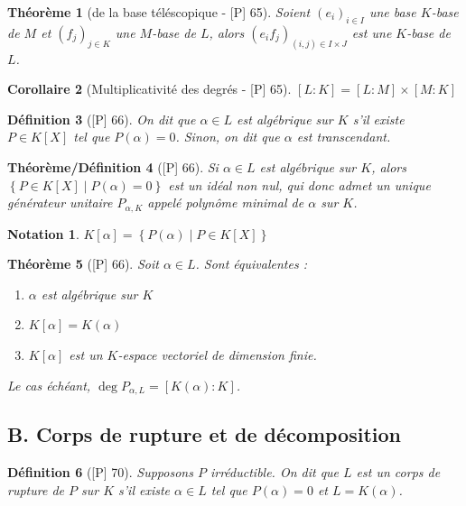 \documentclass[10pt, a4paper, parskip=full, twoside, twocolumn]{report}
\newtheorem{definition}{Définition}
\newtheorem{theorem}[definition]{Théorème}
\newtheorem{theorem_def}[definition]{Théorème/Définition}
\newtheorem{corollary}[definition]{Corollaire}
\newtheorem*{notation*}{Notation}
\begin{document}
\begin{theorem}[de la base téléscopique - \textnormal{[P] 65}]
	Soient $\left(e_i\right)_{i\in I}$ une base $K$-base de $M$ et $\left(f_j\right)_{j\in K}$ une $M$-base de $L$,
	alors $\left(e_if_j\right)_{(i,j)\in I\times J}$ est une $K$-base de $L$.
\end{theorem}

\begin{corollary}[Multiplicativité des degrés - \textnormal{[P] 65}]
	$[L:K] = [L:M]\times [M:K]$
\end{corollary}

\begin{definition}[\textnormal{[P] 66}]
	On dit que $\alpha\in L$ est \emph{algébrique sur $K$} s'il existe $P\in K[X]$ tel que $P(\alpha)=0$.
	Sinon, on dit que $\alpha$ est \emph{transcendant}.
\end{definition}

\begin{theorem_def}[\textnormal{[P] 66}]
	Si $\alpha\in L$ est algébrique sur $K$, alors $\left\{P\in K[X]\mid P(\alpha) = 0\right\}$
	est un idéal non nul, qui donc admet un unique générateur unitaire $P_{\alpha, K}$ appelé \emph{polynôme minimal de $\alpha$ sur $K$}.
\end{theorem_def}

\begin{notation*}
	$K[\alpha] = \left\{P(\alpha)\mid P\in K[X]\right\}$
\end{notation*}

\begin{theorem}[\textnormal{[P] 66}]
	Soit $\alpha\in L$. Sont équivalentes :
	\begin{enumerate}
		\item $\alpha$ est algébrique sur $K$
		\item $K[\alpha] = K(\alpha)$
		\item $K[\alpha]$ est un $K$-espace vectoriel de dimension finie.
	\end{enumerate}

	Le cas échéant, $\deg P_{\alpha, L} = [K(\alpha) : K]$.
\end{theorem}

\subsection*{B. Corps de rupture et de décomposition}

\begin{definition}[\textnormal{[P] 70}]
	Supposons $P$ irréductible. On dit que $L$ est un \emph{corps de rupture de $P$ sur $K$} s'il existe $\alpha\in L$ tel que $P(\alpha) = 0$ et $L=K(\alpha)$.
\end{definition}
\end{document}

